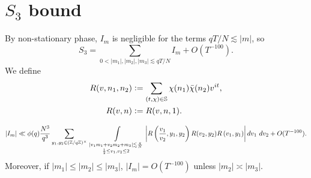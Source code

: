 \section{$S_3$ bound}
By non-stationary phase, $I_m$ is negligible for the terms $qT/N\lesssim |m|$, so 
\begin{equation}
    S_3 = \sum_{0<|m_1|,|m_2|,|m_3|\lesssim qT/N} I_m + O(T^{-100}).
\end{equation}
We define \begin{align*}
    R(v,n_1,n_2)&\mathrel{\mathop:}= \sum_{(t,\chi)\in \mathbb{S}} 
    \chi({n_1})\bar{\chi}(n_2)v^{it},\\
    R(v,n)&\mathrel{\mathop:}= R(v,n,1).
\end{align*}
\begin{proposition}
    \[
    |I_m|\ll \phi(q) \frac{N^3}{q^3}  
    \sum_{y_1,y_2\in (\mathbb{Z}/q\mathbb{Z})^\times}\ \int\displaylimits_{\substack{
        |v_1m_1+v_2m_2+m_3|\lesssim \frac{q}{N}\\
        \frac{1}{2}\leq v_1,v_2\leq 2
    }} \left| R\left(\frac{v_1}{v_2},y_1,y_2\right)
    R(v_2,y_2)R\left(v_1,y_1\right)\right| dv_1 \ dv_2  + O(T^{-100}).\\
    \]
    Moreover, if $|m_1|\leq|m_2|\leq |m_3|$, $|I_m|=O(T^{-100})$ unless $|m_2|\asymp|m_3|$.
\end{proposition}

